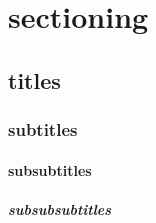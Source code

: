 \documentclass{report}
\begin{document}
\tableofcontents
\chapter{sectioning}
\section{titles}
\subsection{subtitles}
\subsubsection{subsubtitles}
\paragraph{subsubsubtitles}
\end{document}
